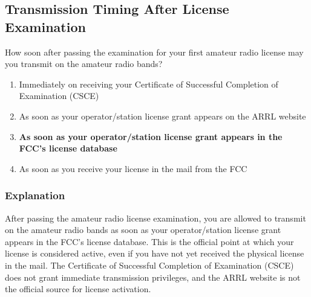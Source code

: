 \subsection{Transmission Timing After License Examination}
\label{T1C10}

\begin{tcolorbox}[colback=gray!10!white,colframe=black!75!black,title=T1C10]
How soon after passing the examination for your first amateur radio license may you transmit on the amateur radio bands?
\begin{enumerate}[label=\Alph*),noitemsep]
    \item Immediately on receiving your Certificate of Successful Completion of Examination (CSCE)
    \item As soon as your operator/station license grant appears on the ARRL website
    \item \textbf{As soon as your operator/station license grant appears in the FCC’s license database}
    \item As soon as you receive your license in the mail from the FCC
\end{enumerate}
\end{tcolorbox}

\subsubsection*{Explanation}
After passing the amateur radio license examination, you are allowed to transmit on the amateur radio bands as soon as your operator/station license grant appears in the FCC’s license database. This is the official point at which your license is considered active, even if you have not yet received the physical license in the mail. The Certificate of Successful Completion of Examination (CSCE) does not grant immediate transmission privileges, and the ARRL website is not the official source for license activation.